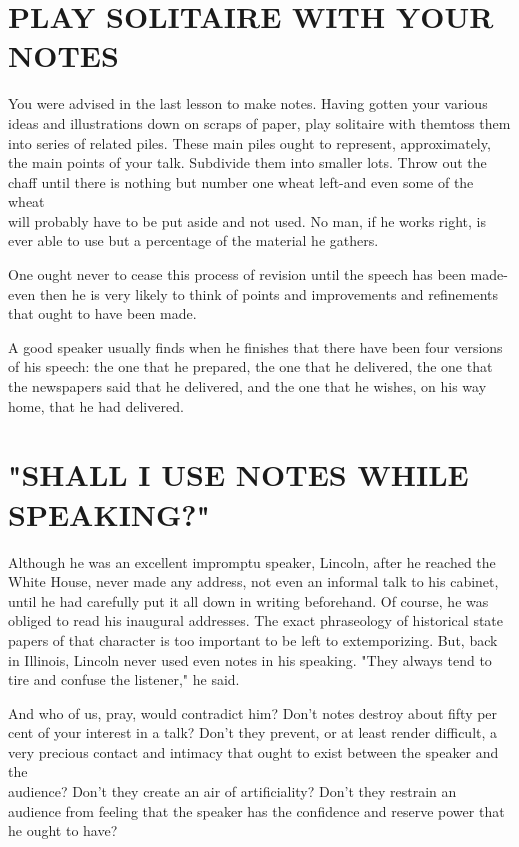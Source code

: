 \documentclass[10pt]{article}
\begin{document}
\section*{PLAY SOLITAIRE WITH YOUR NOTES}
You were advised in the last lesson to make notes. Having gotten your various ideas and illustrations down on scraps of paper, play solitaire with themtoss them into series of related piles. These main piles ought to represent, approximately, the main points of your talk. Subdivide them into smaller lots. Throw out the chaff until there is nothing but number one wheat left-and even some of the wheat\\
will probably have to be put aside and not used. No man, if he works right, is ever able to use but a percentage of the material he gathers.

One ought never to cease this process of revision until the speech has been made-even then he is very likely to think of points and improvements and refinements that ought to have been made.

A good speaker usually finds when he finishes that there have been four versions of his speech: the one that he prepared, the one that he delivered, the one that the newspapers said that he delivered, and the one that he wishes, on his way home, that he had delivered.

\section*{"SHALL I USE NOTES WHILE SPEAKING?"}
Although he was an excellent impromptu speaker, Lincoln, after he reached the White House, never made any address, not even an informal talk to his cabinet, until he had carefully put it all down in writing beforehand. Of course, he was obliged to read his inaugural addresses. The exact phraseology of historical state papers of that character is too important to be left to extemporizing. But, back in Illinois, Lincoln never used even notes in his speaking. "They always tend to tire and confuse the listener," he said.

And who of us, pray, would contradict him? Don't notes destroy about fifty per cent of your interest in a talk? Don't they prevent, or at least render difficult, a very precious contact and intimacy that ought to exist between the speaker and the\\
audience? Don't they create an air of artificiality? Don't they restrain an audience from feeling that the speaker has the confidence and reserve power that he ought to have?
\end{document}
